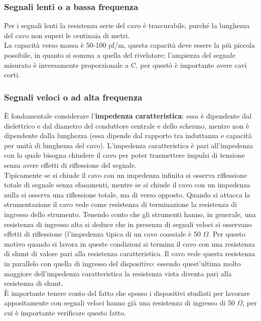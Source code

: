 \subsubsection{Segnali lenti o a bassa frequenza}
Per i segnali lenti la resistenza serie del cavo \`e trascurabile, purch\'e la lunghezza del cavo non superi le centinaia di metri.\\
La capacit\`a verso massa \`e 50-100 pf/m, questa capacit\`a deve essere la pi\`u piccola possibile, in quanto si somma a quella del rivelatore;
l'ampiezza del segnale misurato \`e inversamente proporzionale a C, per quest\`o \`e importante avere cavi corti.
\subsubsection{Segnali veloci o ad alta frequenza}
\`E fondamentale considerare l'\textbf{impedenza caratteristica}: essa \`e dipendente dal dielettrico e dal diametro del conduttore centrale
e dello schermo, mentre non \`e dipendente dalla lunghezza (essa dipende dal rapporto tra induttanza e capacit\`a per unit\`a di lunghezza del cavo).
L'impedenza caratteristica \`e pari all'impedenza con la quale bisogna chiudere il cavo per poter trasmettere impulsi di tensione senza
avere effetti di riflessione del segnale.\\
Tipicamente se si chiude il cavo con un impedenza infinita si osserva riflessione totale di segnale senza sfasamenti,
mentre se si chiude il cavo con un impedenza nulla si osserva una riflessione totale, ma di verso opposto.
Quando si attacca la strumentazione il cavo vede come resistenza di terminazione la resistenza di ingresso dello strumento.
Tenendo conto che gli strumenti hanno, in generale, una resistenza di ingresso alta si deduce che in presenza di segnali veloci si osservano effetti
di riflessione (l'impedenza tipica di un cavo coassiale \`e 50 $\Omega$.
Per questo motivo quando si lavora in queste condizioni si termina il cavo con una resistenza di shunt di valore pari alla resistenza caratteristica.
Il cavo vede questa resistenza in parallelo con quella di ingresso del dispositivo: essendo quest'ultima molto maggiore dell'impedenza caratteristica
la resistenza vista diventa pari alla resistenza di shunt.\\
\`E importante tenere conto del fatto che spesso i dispositivi studiati per lavorare appositamente con segnali veloci hanno gi\`a una resistenza di ingresso di 50 $\Omega$,
per cui \`e importante verificare questo fatto.
